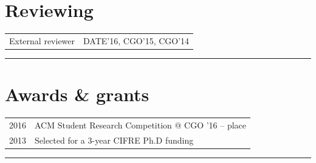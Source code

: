 \documentclass[english,9pt]{extarticle}
\begin{document}
\clearpage


\section*{Reviewing}
\begin{tabular}{p{}p{}}
	External reviewer & DATE'16, CGO'15, CGO'14
\end{tabular}

\noindent\rule{\textwidth}{1pt}

\section*{Awards \& grants}
\begin{tabular}{p{}p{}}
	2016 &
	ACM Student Research Competition @ CGO '16 -- \nth{2} place
	\\
	2013 &
	Selected for a 3-year CIFRE Ph.D funding
	\vspace{0.2cm} \\
\end{tabular}


\noindent\rule{\textwidth}{1pt}

\end{document}
